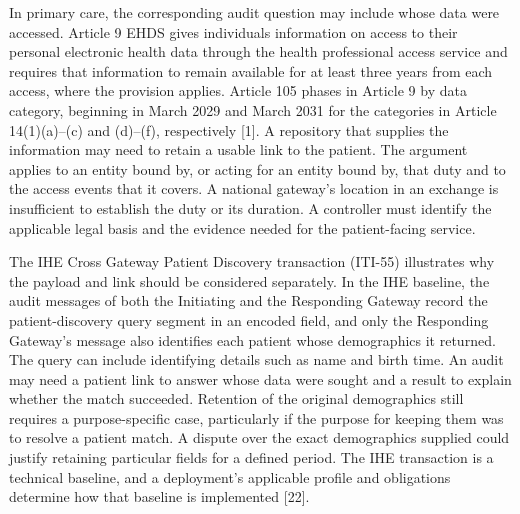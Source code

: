 \documentclass[5p,twocolumn]{elsarticle}
\begin{document}
In primary care, the corresponding audit question may include whose data
were accessed. Article 9 EHDS gives individuals information on access to
their personal electronic health data through the health professional
access service and requires that information to remain available for at
least three years from each access, where the provision applies. Article
105 phases in Article 9 by data category, beginning in March 2029 and
March 2031 for the categories in Article 14(1)(a)--(c) and (d)--(f),
respectively {[}1{]}. A repository that supplies the information may
need to retain a usable link to the patient. The argument applies to an
entity bound by, or acting for an entity bound by, that duty and to the
access events that it covers. A national gateway's location in an
exchange is insufficient to establish the duty or its duration. A
controller must identify the applicable legal basis and the evidence
needed for the patient-facing service.

The IHE Cross Gateway Patient Discovery transaction (ITI-55) illustrates
why the payload and link should be considered separately. In the IHE
baseline, the audit messages of both the Initiating and the Responding
Gateway record the patient-discovery query segment in an encoded field,
and only the Responding Gateway's message also identifies each patient
whose demographics it returned. The query can include identifying
details such as name and birth time. An audit may need a patient link to
answer whose data were sought and a result to explain whether the match
succeeded. Retention of the original demographics still requires a
purpose-specific case, particularly if the purpose for keeping them was
to resolve a patient match. A dispute over the exact demographics
supplied could justify retaining particular fields for a defined period.
The IHE transaction is a technical baseline, and a deployment's
applicable profile and obligations determine how that baseline is
implemented {[}22{]}.
\end{document}
